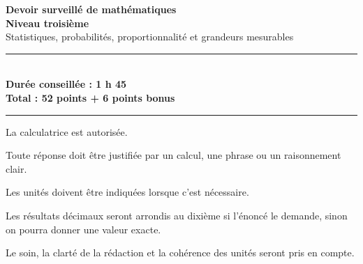 \documentclass[11pt,a4paper]{article}
\begin{document}
\begin{center}
    {\Huge \textbf{Devoir surveillé de mathématiques}}\\[0.2cm]
    {\Large \textbf{Niveau troisième}}\\[0.2cm]
    {\large Statistiques, probabilités, proportionnalité et grandeurs mesurables}\\[0.3cm]
    \rule{0.9\linewidth}{0.6pt}\\[0.2cm]
    \textbf{Durée conseillée : 1 h 45}\\
    \textbf{Total : 52 points + 6 points bonus}\\[0.2cm]
    \rule{0.9\linewidth}{0.6pt}
\end{center}

\vspace{0.4cm}

\begin{consignesbox}
La calculatrice est autorisée.

Toute réponse doit être justifiée par un calcul, une phrase ou un raisonnement clair.

Les unités doivent être indiquées lorsque c’est nécessaire.

Les résultats décimaux seront arrondis au dixième si l’énoncé le demande, sinon on pourra donner une valeur exacte.

Le soin, la clarté de la rédaction et la cohérence des unités seront pris en compte.
\end{consignesbox}

\vspace{0.4cm}
\end{document}

